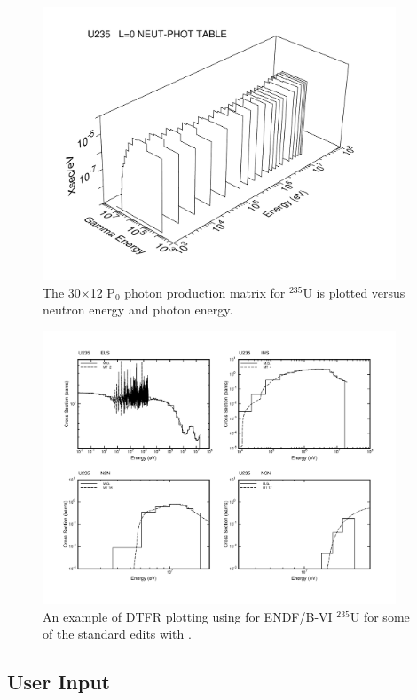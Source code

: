 \begin{figure}[t]\centering
\includegraphics[keepaspectratio, height=3.2in, angle=0]{figs/dtfr4ack}
\caption[DTFR photon production matrix plot example]{The 30${\times}$12 P$_0$
 photon production matrix for $^{235}$U is plotted versus neutron energy
 and photon energy.}
\label{sing4}
\end{figure}

\begin{figure}[b]\centering
\includegraphics[keepaspectratio, height=3.2in, angle=0]{figs/dtfr5ack}
\caption[DTFR plot example, multiple plots per frame]{An example of DTFR
 plotting using  for ENDF/B-VI $^{235}$U for some of the
 standard edits with .}
\label{four}
\end{figure}

\subsection{User Input}
\label{ssDTFR_inp}

